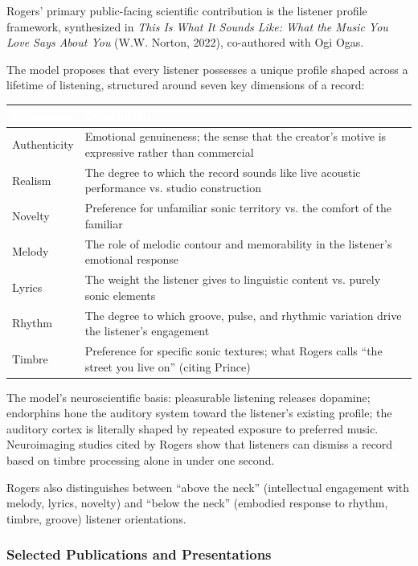 \documentclass[11pt,letterpaper]{article}
\newcommand{\tableheader}[1]{\textbf{\sffamily\textcolor{white}{#1}}}
\begin{document}
Rogers' primary public-facing scientific contribution is the listener profile framework, synthesized in \textit{This Is What It Sounds Like: What the Music You Love Says About You} (W.W. Norton, 2022), co-authored with Ogi Ogas.

The model proposes that every listener possesses a unique profile shaped across a lifetime of listening, structured around seven key dimensions of a record:

\begin{center}
\begin{tabularx}{\textwidth}{L{3cm}X}
\toprule
{}
\tableheader{Dimension} & \tableheader{Description} \\
\midrule
Authenticity & Emotional genuineness; the sense that the creator's motive is expressive rather than commercial \\
Realism & The degree to which the record sounds like live acoustic performance vs. studio construction \\
Novelty & Preference for unfamiliar sonic territory vs. the comfort of the familiar \\
Melody & The role of melodic contour and memorability in the listener's emotional response \\
Lyrics & The weight the listener gives to linguistic content vs. purely sonic elements \\
Rhythm & The degree to which groove, pulse, and rhythmic variation drive the listener's engagement \\
Timbre & Preference for specific sonic textures; what Rogers calls ``the street you live on'' (citing Prince) \\
\bottomrule
\end{tabularx}
\end{center}

The model's neuroscientific basis: pleasurable listening releases dopamine; endorphins hone the auditory system toward the listener's existing profile; the auditory cortex is literally shaped by repeated exposure to preferred music. Neuroimaging studies cited by Rogers show that listeners can dismiss a record based on timbre processing alone in under one second.

Rogers also distinguishes between ``above the neck'' (intellectual engagement with melody, lyrics, novelty) and ``below the neck'' (embodied response to rhythm, timbre, groove) listener orientations.

\subsubsection{Selected Publications and Presentations}
\end{document}
